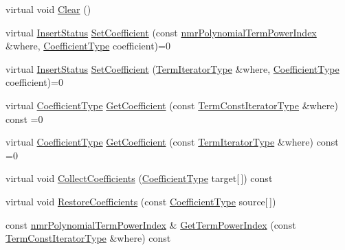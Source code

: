 \begin{DoxyCompactItemize}
virtual void \hyperlink{classnmr_polynomial_container_a0d62bc3c08f01936868cbed1b32abeda}{Clear} ()
\item 
virtual \hyperlink{classnmr_polynomial_base_ac3b6b28653104ea70419279a35580940}{Insert\-Status} \hyperlink{classnmr_polynomial_container_a4ac9b1833ec593f10d54baaa7a2ebe81}{Set\-Coefficient} (const \hyperlink{classnmr_polynomial_term_power_index}{nmr\-Polynomial\-Term\-Power\-Index} \&where, \hyperlink{classnmr_polynomial_base_a8693efdfc8585ccb49abea69f74f3eef}{Coefficient\-Type} coefficient)=0
\item 
virtual \hyperlink{classnmr_polynomial_base_ac3b6b28653104ea70419279a35580940}{Insert\-Status} \hyperlink{classnmr_polynomial_container_a5b1188598da1993c8a1497a403af2b18}{Set\-Coefficient} (\hyperlink{classnmr_polynomial_container_a276e57445d038e8a16462f47b85719a3}{Term\-Iterator\-Type} \&where, \hyperlink{classnmr_polynomial_base_a8693efdfc8585ccb49abea69f74f3eef}{Coefficient\-Type} coefficient)=0
\item 
virtual \hyperlink{classnmr_polynomial_base_a8693efdfc8585ccb49abea69f74f3eef}{Coefficient\-Type} \hyperlink{classnmr_polynomial_container_ae2526acacd3b7d957524818a87619a65}{Get\-Coefficient} (const \hyperlink{classnmr_polynomial_container_aba8d31506ab6a487fdc4fe2815469442}{Term\-Const\-Iterator\-Type} \&where) const =0
\item 
virtual \hyperlink{classnmr_polynomial_base_a8693efdfc8585ccb49abea69f74f3eef}{Coefficient\-Type} \hyperlink{classnmr_polynomial_container_ae92f218f650f44ec1c22528cc19d6790}{Get\-Coefficient} (const \hyperlink{classnmr_polynomial_container_a276e57445d038e8a16462f47b85719a3}{Term\-Iterator\-Type} \&where) const =0
\item 
virtual void \hyperlink{classnmr_polynomial_container_a1a543d698e2f173271bdd0642d8404b0}{Collect\-Coefficients} (\hyperlink{classnmr_polynomial_base_a8693efdfc8585ccb49abea69f74f3eef}{Coefficient\-Type} target\mbox{[}$\,$\mbox{]}) const 
\item 
virtual void \hyperlink{classnmr_polynomial_container_a035c9c6e4b57de5106d5de512ce42cca}{Restore\-Coefficients} (const \hyperlink{classnmr_polynomial_base_a8693efdfc8585ccb49abea69f74f3eef}{Coefficient\-Type} source\mbox{[}$\,$\mbox{]})
\item 
const \hyperlink{classnmr_polynomial_term_power_index}{nmr\-Polynomial\-Term\-Power\-Index} \& \hyperlink{classnmr_polynomial_container_aa11e3c563a7f25d0754d2b558731b68f}{Get\-Term\-Power\-Index} (const \hyperlink{classnmr_polynomial_container_aba8d31506ab6a487fdc4fe2815469442}{Term\-Const\-Iterator\-Type} \&where) const 

\end{DoxyCompactItemize}
